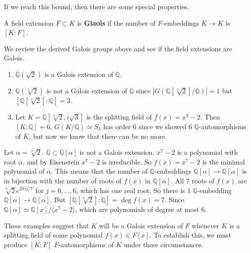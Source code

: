   If we reach this bound, then there are some special properties. 

  \begin{definition}[Galois]
    A field extension $F \subset K$ is \textbf{Glaois} if the number of $F$-embeddings $K \to K$ is $[K:F]$. 
  \end{definition}

  \begin{example}
    We review the derived Galois groups above and see if the field extensions are Galois. 
    \begin{enumerate}
      \item $\mathbb{Q}(\sqrt{2})$ is a Galois extension of $\mathbb{Q}$. 
      \item $\mathbb{Q}(\sqrt[3]{2})$ is not a Galois extension of $\mathbb{Q}$ since $|G(\mathbb{Q}[\sqrt[3]{2}]/\mathbb{Q})| = 1$ but $[\mathbb{Q}[\sqrt[3]{2}] : \mathbb{Q}] = 3$. 
      \item Let $K = \mathbb{Q}[\sqrt[3]{2}, i \sqrt{3}]$ is the splitting field of $f(x) = x^3 - 2$. Then $[K:\mathbb{Q}] = 6$. $G(K/\mathbb{Q}) \simeq S_3$ has order $6$ since we showed 6 $\mathbb{Q}$-automorphisms of $K$, but now we know that there can be no more. 
    \end{enumerate}
  \end{example}

  \begin{example}
    Let $\alpha = \sqrt[7]{2}$. $\mathbb{Q} \subset \mathbb{Q}[\alpha]$ is not a Galois extension. $x^7 - 2$ is a polynomial with root $\alpha$, and by Eisenstein $x^7 - 2$ is irreducible. So $f(x) = x^7 - 2$ is the minimal polynomial of $\alpha$. This means that the number of $\mathbb{Q}$-embeddings $\mathbb{Q}[\alpha] \to \mathbb{Q}[\alpha]$ is in bijection with the number of roots of $f(x)$ in $\mathbb{Q}[\alpha]$. All $7$ roots of $f(x)$ are $\sqrt[7]{2} e^{2\pi i j/7}$ for $j = 0, \ldots, 6$, which has one real root. So there is $1$ $\mathbb{Q}$-embedding $\mathbb{Q}[\alpha] \to \mathbb{Q}[\alpha]$. But $[\mathbb{Q}[\sqrt[7]{2}] : \mathbb{Q}] = \deg{f(x)} = 7$. Since $\mathbb{Q}[\alpha] \simeq \mathbb{Q}[x]/{\langle x^7 - 2 \rangle}$, which are polynomials of degree at most $6$. 
  \end{example}

  These examples suggest that $K$ will be a Galois extension of $F$ whenever $K$ is a splitting field of some polynomial $f(x) \in F[x]$. To establish this, we must produce $[K:F]$ $F$-automorphisms of $K$ under these circumstances. 

